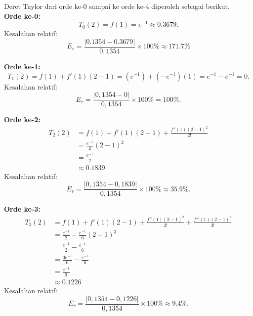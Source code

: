 \documentclass{article}
\begin{document}
\begin{enumerate}
    Deret Taylor dari orde ke-0 sampai ke orde ke-4 diperoleh sebagai berikut. \\

    \textbf{Orde ke-0:} 
    \begin{equation*}
        T_0(2) = f(1) = e^{-1} \approx \num{0,3679}.
    \end{equation*}
    Kesalahan relatif: 
    \begin{equation*}
        E_r = \frac{\left|\num{0,1354} - \num{0,3679}\right|}{0,1354} \times 100\% \approx \num{171,7}\%
    \end{equation*}

    \textbf{Orde ke-1:} 
    \begin{equation*}
        T_1(2) = f(1) + f'(1)(2-1) = (e^{-1}) + (-e^{-1})(1) = e^{-1} - e^{-1} = 0.
    \end{equation*}
    Kesalahan relatif:
    \begin{equation*}
        E_r = \frac{\left|0,1354 - 0\right|}{0,1354} \times 100\% = 100\%.
    \end{equation*}
    
    \textbf{Orde ke-2:} 
    \begin{align*}
        T_2(2) 
        &= f(1) + f'(1)(2-1) + \frac{f''(1)(2-1)^2}{2!} \\
        &= \frac{e^{-1}}{2}(2-1)^2 \\
        &= \frac{e^{-1}}{2} \\
        &\approx \num{0,1839}
    \end{align*}
    Kesalahan relatif:
    \begin{equation*}
        E_r = \frac{\left|0,1354 - 0,1839\right|}{0,1354} \times 100\% \approx \num{35,9}\%.
    \end{equation*}
    
    \textbf{Orde ke-3:} 
    \begin{align*}
        T_3(2) 
        &= f(1) + f'(1)(2-1) + \frac{f''(1)(2-1)^2}{2!} + \frac{f'''(1)(2-1)^3}{3!}\\
        &= \frac{e^{-1}}{2} - \frac{e^{-1}}{6}(2-1)^3 \\
        &= \frac{e^{-1}}{2} - \frac{e^{-1}}{6} \\
        &= \frac{3e^{-1}}{6} - \frac{e^{-1}}{6} \\
        &= \frac{e^{-1}}{3} \\ 
        &\approx \num{0,1226}
    \end{align*}
    Kesalahan relatif:
    \begin{equation*}
        E_r = \frac{\left|0,1354 - 0,1226\right|}{0,1354} \times 100\% \approx \num{9,4}\%.
    \end{equation*}
    

\end{enumerate}
\end{document}
